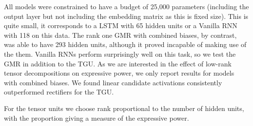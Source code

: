 All models were constrained to have a budget of 25,000 parameters (including the output layer but
not including the embedding matrix as this is fixed size). This is quite small, it corresponds to
a LSTM with 65 hidden units or a Vanilla RNN with 118 on this data. The rank one GMR with combined 
biases, by contrast,
was able to have 293 hidden units, although it proved incapable of making use of the them. Vanilla RNNs
perform surprisingly well on this task, so we test the GMR in addition to the TGU. As we are interested
in the effect of low-rank tensor decompositions on expressive power, we only report results for models
with combined biases. We found linear candidate activations consistently outperformed rectifiers for
the TGU.

For the tensor units we choose rank proportional to the number of hidden units, with the proportion
giving a measure of the expressive power.


